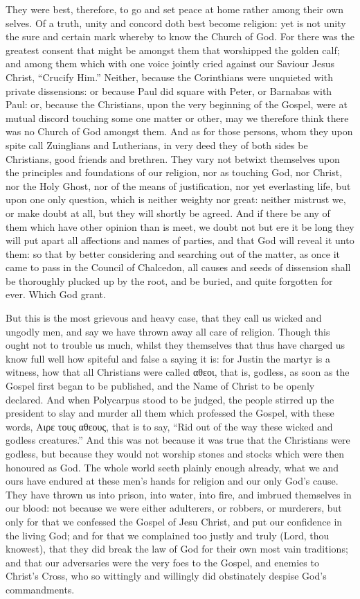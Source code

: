 They were best, therefore, to go and set peace at home rather among
their own selves. Of a truth, unity and concord doth best become
religion: yet is not unity the sure and certain mark whereby to know
the Church of God. For there was the greatest consent that might
be amongst them that worshipped the golden calf; and among them which
with one voice jointly cried against our Saviour Jesus Christ, “Crucify
Him.” Neither, because the Corinthians were unquieted with
private dissensions: or because Paul did square
with Peter, or Barnabas with Paul: or, because the Christians, upon
the very beginning of the Gospel, were at mutual discord touching some
one matter or other, may we therefore think there was no Church of God
amongst them. And as for those persons, whom they upon spite call
Zuinglians and Lutherians, in very deed they of both sides be Christians,
good friends and brethren. They vary not betwixt themselves upon
the principles and foundations of our religion, nor as touching God,
nor Christ, nor the Holy Ghost, nor of the means of justification, nor
yet everlasting life, but upon one only question, which is neither weighty
nor great: neither mistrust we, or make doubt at all, but they will
shortly be agreed. And if there be any of them which have other
opinion than is meet, we doubt not but ere it be long they will put
apart all affections and names of parties, and that God will reveal
it unto them: so that by better considering and searching out of the
matter, as once it came to pass in the Council of Chalcedon, all causes
and seeds of dissension shall be thoroughly plucked up by the root,
and be buried, and quite forgotten for ever. Which God grant.

But this is the most grievous and heavy case, that they call us wicked
and ungodly men, and say
we have thrown away all care of religion. Though this ought not
to trouble us much, whilst they themselves that thus have charged us
know full well how spiteful and false a saying it is: for Justin the
martyr is a witness, how that all Christians were called αθεοι,
that is, godless, as soon as the Gospel first began to be published,
and the Name of Christ to be openly declared. And when Polycarpus
stood to be judged, the people stirred up the president to slay and
murder all them which professed the Gospel, with these words, Αιρε
τους αθεους,
that is to say, “Rid out of the way these wicked and godless creatures.”
And this was not because it was true that the Christians were godless,
but because they would not worship stones and stocks which were then
honoured as God. The whole world seeth plainly enough already,
what we and ours have endured at these men’s hands for religion
and our only God’s cause. They have thrown us into prison,
into water, into fire, and imbrued themselves in our blood: not because
we were either adulterers, or robbers, or murderers, but only for that
we confessed the Gospel of Jesu Christ, and put our confidence in the
living God; and for that we complained too justly and truly (Lord, thou
knowest), that they did break the law of God for their
own most vain traditions; and that our adversaries were the very foes
to the Gospel, and enemies to Christ’s Cross, who so wittingly
and willingly did obstinately despise God’s commandments.

